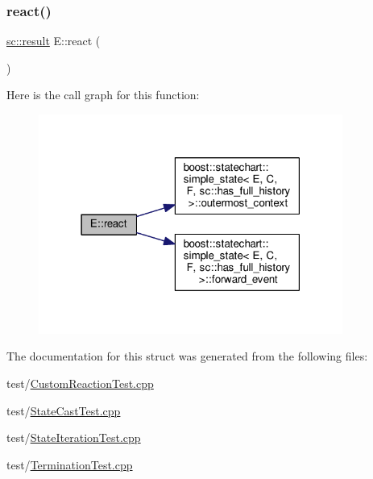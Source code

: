 \subsubsection{\texorpdfstring{react()}{react()}\hspace{0.1cm}{\footnotesize\ttfamily [4/4]}}
{\footnotesize\ttfamily \mbox{\hyperlink{namespaceboost_1_1statechart_abe807f6598b614d6d87bb951ecd92331}{sc\+::result}} E\+::react (\begin{DoxyParamCaption}\item[{const \mbox{\hyperlink{struct_ev_discard_in_d}{Ev\+Discard\+InD}} \&}]{ }\end{DoxyParamCaption})\hspace{0.3cm}{\ttfamily [inline]}}

Here is the call graph for this function\+:
\nopagebreak
\begin{figure}[H]
\begin{center}
\leavevmode
\includegraphics[width=283pt]{struct_e_a12a9677bb416edbfde60653d5d587430_cgraph}
\end{center}
\end{figure}


The documentation for this struct was generated from the following files\+:\begin{DoxyCompactItemize}
\item 
test/\mbox{\hyperlink{_custom_reaction_test_8cpp}{Custom\+Reaction\+Test.\+cpp}}\item 
test/\mbox{\hyperlink{_state_cast_test_8cpp}{State\+Cast\+Test.\+cpp}}\item 
test/\mbox{\hyperlink{_state_iteration_test_8cpp}{State\+Iteration\+Test.\+cpp}}\item 
test/\mbox{\hyperlink{_termination_test_8cpp}{Termination\+Test.\+cpp}}\end{DoxyCompactItemize}
